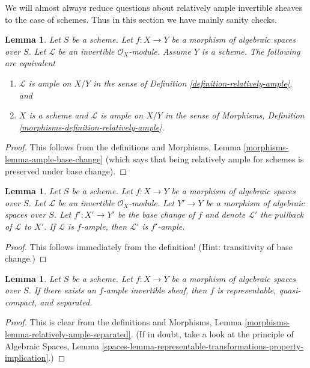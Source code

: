 \documentclass{stacks-project}
\theoremstyle{plain}
\newtheorem{lemma}[subsection]{Lemma}
\theoremstyle{definition}
\theoremstyle{remark}
\numberwithin{equation}{subsection}
\begin{document}
\noindent
We will almost always reduce questions about relatively ample invertible
sheaves to the case of schemes. Thus in this section we have
mainly sanity checks.

\begin{lemma}
\label{lemma-relatively-ample-sanity-check}
Let $S$ be a scheme.
Let $f : X \to Y$ be a morphism of algebraic spaces over $S$.
Let $\mathcal{L}$ be an invertible $\mathcal{O}_X$-module.
Assume $Y$ is a scheme. The following are equivalent
\begin{enumerate}
\item $\mathcal{L}$ is ample on $X/Y$ in the sense of
Definition \ref{definition-relatively-ample}, and
\item $X$ is a scheme and $\mathcal{L}$ is ample on $X/Y$
in the sense of
Morphisms, Definition \ref{morphisms-definition-relatively-ample}.
\end{enumerate}
\end{lemma}

\begin{proof}
This follows from the definitions and
Morphisms, Lemma \ref{morphisms-lemma-ample-base-change}
(which says that being relatively ample for schemes
is preserved under base change).
\end{proof}

\begin{lemma}
\label{lemma-ample-base-change}
Let $S$ be a scheme.
Let $f : X \to Y$ be a morphism of algebraic spaces over $S$.
Let $\mathcal{L}$ be an invertible $\mathcal{O}_X$-module.
Let $Y' \to Y$ be a morphism of algebraic spaces over $S$.
Let $f' : X' \to Y'$ be the base change of $f$ and denote
$\mathcal{L}'$ the pullback of $\mathcal{L}$ to $X'$.
If $\mathcal{L}$ is $f$-ample, then $\mathcal{L}'$ is $f'$-ample.
\end{lemma}

\begin{proof}
This follows immediately from the definition!
(Hint: transitivity of base change.)
\end{proof}

\begin{lemma}
\label{lemma-relatively-ample-properties}
Let $S$ be a scheme.
Let $f : X \to Y$ be a morphism of algebraic spaces over $S$.
If there exists an $f$-ample invertible sheaf, then
$f$ is representable, quasi-compact, and separated.
\end{lemma}

\begin{proof}
This is clear from the definitions and
Morphisms, Lemma \ref{morphisms-lemma-relatively-ample-separated}.
(If in doubt, take a look at the principle of
Algebraic Spaces, Lemma
\ref{spaces-lemma-representable-transformations-property-implication}.)
\end{proof}
\end{document}
